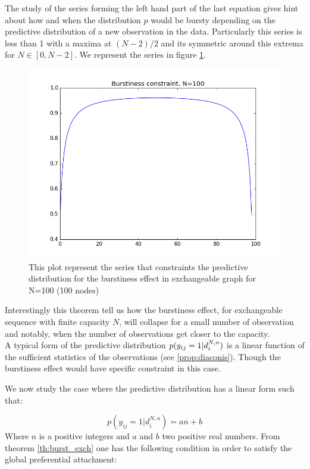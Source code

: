 	The study of the series forming the left hand part of the last equation gives hint about how and when the distribution $p$ would be bursty depending on the predictive distribution of a new observation in the data. Particularly this series is less than 1 with a maxima at $(N-2)/2$ and its symmetric around this extrema for $N \in [0, N-2]$. We represent the series in figure \ref{fig:bp}.
	
	
	\begin{figure}[h]
		\centering
		\includegraphics[scale=0.4]{img/bp}
		\caption{This plot represent the series that constraints the predictive distribution for the burstiness effect in exchangeable graph for N=100 (100 nodes)}
		\label{fig:bp}
	\end{figure}



Interestingly this theorem tell us how the burstiness effect, for exchangeable sequence with finite capacity $N$, will collapse for a small number of observation and notably, when the number of observations get closer to the capacity.\\

A typical form of the predictive distribution $p(y_{ij}=1 | d_i^{N,n})$ is a linear function of the sufficient statistics of the observations (see \ref{prop:diaconis}). Though the burstiness effect would have specific constraint in this case.

We now study the case where the predictive distribution has a linear form such that:

\begin{equation}
p(y_{ij}=1 | d_i^{N,n}) = an+b
\end{equation}  
Where $n$ is a positive integers and $a$ and $b$ two positive real numbers. From theorem \ref{th:burst_exch} one has the following condition in order to satisfy the global preferential attachment:

